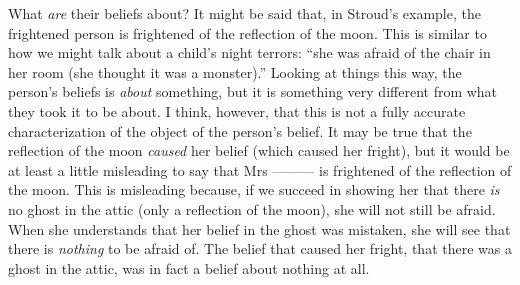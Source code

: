 \documentclass[11pt]{article}
\begin{document}
\begin{spacing}{1.5}
What {\em are} their beliefs about? It might be said that, in Stroud's example, the frightened person is frightened of the reflection of the moon. This is similar to how we might talk about a child's night terrors: ``she was afraid of the chair in her room (she thought it was a monster).'' Looking at things this way, the person's beliefs is {\em about} something, but it is something very different from what they took it to be about. I think, however, that this is not a fully accurate characterization of the object of the person's belief. It may be true that the reflection of the moon {\em caused} her belief (which caused her fright), but it would be at least a little misleading to say that Mrs --------- is frightened of the reflection of the moon. This is misleading because, if we succeed in showing her that there {\em is} no ghost in the attic (only a reflection of the moon), she will not still be afraid. When she understands that her belief in the ghost was mistaken, she will see that there is {\em nothing} to be afraid of. The belief that caused her fright, that there was a ghost in the attic, was in fact a belief about nothing at all.


\end{spacing}
\end{document}
